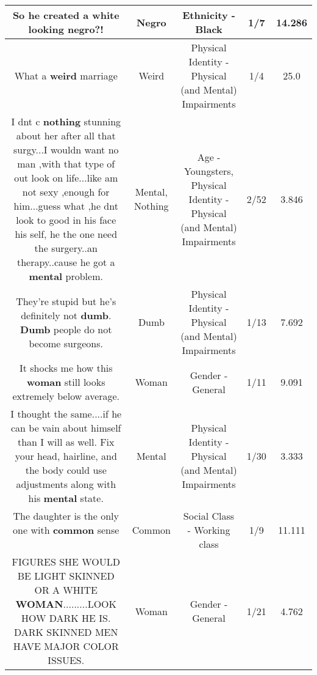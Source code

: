 \documentclass[11pt]{article}
\newlength\mylength
\begin{document}
\begin{center}
\begin{longtable}{|C{.65\mylength}|C{.30\mylength}|C{.12\mylength}|C{.12\mylength}|C{.12\mylength}|}
  \small So he created a white looking \textbf{negro}?!\normalsize   & Negro & Ethnicity - Black & 1/7 & 14.286 \\  \hline
  \small What a \textbf{weird} marriage\normalsize   & Weird & Physical Identity - Physical (and Mental) Impairments & 1/4 & 25.0 \\  \hline
  \small I dnt c \textbf{nothing} stunning about her after all that surgy...I wouldn want no man ,with that type of out look on life...like am not sexy ,enough for him...guess what ,he dnt look to good in his face his self, he the one need the surgery..an therapy..cause he got a \textbf{mental} problem.\normalsize   & Mental, Nothing & Age - Youngsters, Physical Identity - Physical (and Mental) Impairments & 2/52 & 3.846 \\  \hline
  \small They're stupid but he's definitely not \textbf{dumb}. \textbf{Dumb} people do not become surgeons.\normalsize   & Dumb & Physical Identity - Physical (and Mental) Impairments & 1/13 & 7.692 \\  \hline
  \small It shocks me how this \textbf{woman} still looks extremely below average.\normalsize   & Woman & Gender - General & 1/11 & 9.091 \\  \hline
  \small I thought the same....if he can be vain about himself than I will as well. Fix your head, hairline, and the body could use adjustments along with his \textbf{mental} state.\normalsize   & Mental & Physical Identity - Physical (and Mental) Impairments & 1/30 & 3.333 \\  \hline
  \small The daughter is the only one with \textbf{common} sense🤦🏽‍♀️\normalsize   & Common & Social Class - Working class & 1/9 & 11.111 \\  \hline
  \small FIGURES SHE WOULD BE LIGHT SKINNED OR A WHITE \textbf{WOMAN}.........LOOK HOW DARK HE IS. DARK SKINNED MEN HAVE MAJOR COLOR ISSUES.\normalsize   & Woman & Gender - General & 1/21 & 4.762 \\  \hline

\end{longtable}
\end{center}
\end{document}
